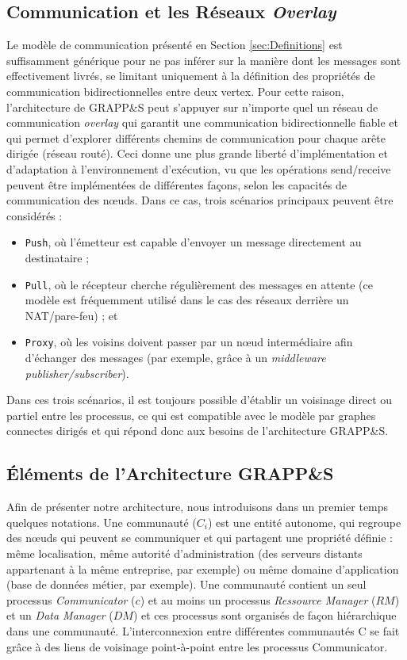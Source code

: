 \subsection{Communication et les Réseaux \textit{Overlay}}
Le modèle de communication présenté en Section \ref{sec:Definitions} est suffisamment générique pour ne pas inférer sur la manière dont les messages sont effectivement livrés, se limitant uniquement à la définition des propriétés de communication bidirectionnelles entre deux vertex. Pour cette raison, l'architecture de GRAPP\&S peut s'appuyer sur n'importe quel un réseau de communication \textit{overlay} qui garantit une communication bidirectionnelle fiable et qui permet d'explorer différents chemins de communication pour chaque arête dirigée (réseau routé). Ceci donne une plus grande liberté d'implémentation et d'adaptation à l'environnement d'exécution, vu que les opérations send/receive peuvent être implémentées de différentes façons, selon les capacités de communication des n{\oe}uds. Dans ce cas, trois scénarios principaux peuvent être considérés : 
\begin{itemize}
	\item \texttt{Push}, où l'émetteur est capable d'envoyer un message directement au destinataire ;
	\item\texttt{Pull}, où le récepteur cherche régulièrement des messages en attente (ce modèle est fréquemment utilisé dans le cas des réseaux derrière un NAT/pare-feu) ; et 
	\item\texttt{Proxy}, où les voisins doivent passer par un n{\oe}ud intermédiaire afin d'échanger des messages (par exemple, grâce à un \textit{middleware} \textit{publisher/subscriber}). 
\end{itemize}
Dans ces trois scénarios, il est toujours possible d'établir un voisinage direct ou partiel entre les processus, ce qui est compatible avec le modèle par graphes connectes dirigés et qui répond donc aux besoins de l'architecture GRAPP\&S. 


\subsection{Éléments de l'Architecture GRAPP\&S}

Afin de présenter notre architecture, nous introduisons dans un premier temps quelques notations. Une communauté ($C_i$) est une entité autonome, qui regroupe des n{\oe}uds qui peuvent se communiquer et qui partagent une propriété définie : même localisation, même autorité d'administration (des serveurs distants appartenant à la même entreprise, par exemple) ou même domaine d'application (base de données métier, par exemple). Une communauté contient un seul processus \textit{Communicator} ($c$) et au moins un processus \textit{Ressource Manager} ($RM$) et un \textit{Data Manager} ($DM$) et ces processus sont organisés de façon hiérarchique dans une communauté. L'interconnexion entre différentes communautés C se fait grâce à des liens de voisinage point-à-point entre les processus Communicator.

